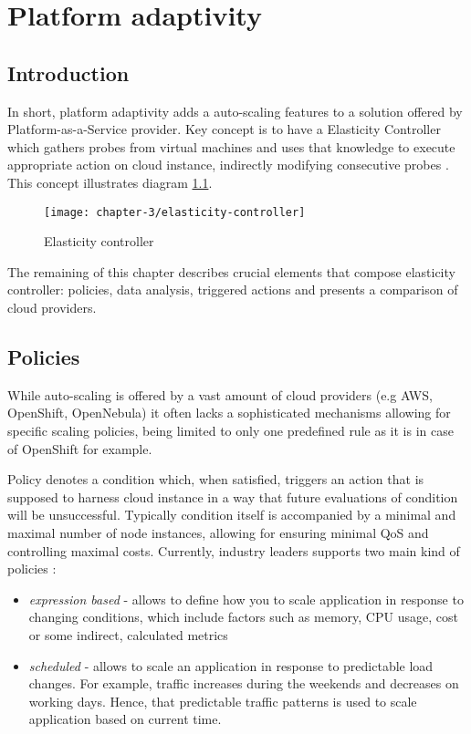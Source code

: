 \chapter{Platform adaptivity}


\section{Introduction}
In short, platform adaptivity adds a auto-scaling features to a solution offered by Platform-as-a-Service provider. Key concept is to have a Elasticity Controller which gathers probes from virtual machines and uses that knowledge to execute appropriate action on cloud instance, indirectly modifying consecutive probes \cite{VaRoBu11}. This concept illustrates diagram \ref{ch3:elasticity-controller}.

\begin{figure}[!ht]
  \begin{center}
    \texttt{[image: chapter-3/elasticity-controller]}
  \end{center}
  \caption{Elasticity controller}
  \label{ch3:elasticity-controller}
\end{figure}

The remaining of this chapter describes crucial elements that compose elasticity controller: policies, data analysis, triggered actions and presents a comparison of cloud providers.
 
\section{Policies}
While auto-scaling is offered by a vast amount of cloud providers (e.g AWS, OpenShift, OpenNebula) it often lacks a sophisticated mechanisms allowing for specific scaling policies, being limited to only one predefined rule as it is in case of OpenShift for example. 
 
Policy denotes a condition which, when satisfied, triggers an action that is supposed to harness cloud instance in a way that future evaluations of condition will be unsuccessful. Typically condition itself is accompanied by a minimal and maximal number of node instances, allowing for ensuring minimal QoS and controlling maximal costs. Currently, industry leaders supports two main kind of policies \cite{AmazonAutoScaling}:
\begin{itemize}
 \item \textit{expression based} - allows to define how you to scale application in response to changing conditions, which include factors such as memory, CPU usage, cost or some indirect, calculated metrics
 \item \textit{scheduled} - allows to scale an application in response to predictable load changes. For example, traffic increases during the weekends and decreases on working days. Hence, that predictable traffic patterns is used to scale application based on current time.
\end{itemize}

